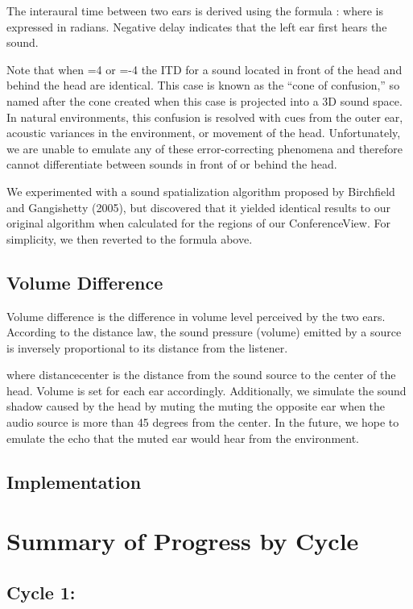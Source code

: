 \documentclass[12pt, letterpaper]{article}
\begin{document}
The interaural time between two ears is derived using the formula : where  is expressed in radians. Negative delay indicates that the left ear first hears the sound. 

Note that when =4 or =-4 the ITD for a sound located in front of the head and behind the head are identical. This case is known as the “cone of confusion,” so named after the cone created when this case is projected into a 3D sound space. In natural environments, this confusion is resolved with cues from the outer ear, acoustic variances in the environment, or movement of the head. Unfortunately, we are unable to emulate any of these error-correcting phenomena and therefore cannot differentiate between sounds in front of or behind the head.

We experimented with a sound spatialization algorithm proposed by Birchfield and Gangishetty (2005), but discovered that it yielded identical results to our original algorithm when calculated for the regions of our ConferenceView. For simplicity, we then reverted to the formula above.

\subsection{Volume Difference}
Volume difference is the difference in volume level perceived by the two ears.  According to the distance law, the sound pressure (volume) emitted by a source is inversely proportional to its distance from the listener.

where distancecenter is the distance from the sound source to the center of the head. Volume is set for each ear accordingly. Additionally, we simulate the sound shadow caused by the head by muting the muting the opposite ear when the audio source is more than 45 degrees from the center. In the future, we hope to emulate the echo that the muted ear would hear from the environment.

\subsection{Implementation}

\section{Summary of Progress by Cycle}

\subsection{Cycle 1: }
\end{document}
